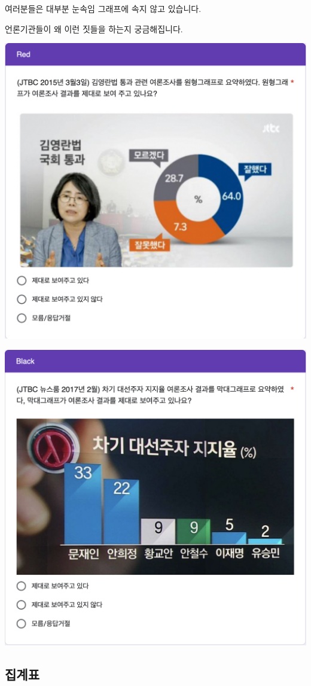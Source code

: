\documentclass[
]{book}
\begin{document}
여러분들은 대부분 눈속임 그래프에 속지 않고 있습니다.

언론기관들이 왜 이런 짓들을 하는지 궁금해집니다.

\includegraphics[width=0.67\linewidth]{./pics/Quiz240308_Q7_Red}

\includegraphics[width=0.67\linewidth]{./pics/Quiz240308_Q7_Black}

\subsection{집계표}\label{uxc9d1uxacc4uxd45c}
\end{document}
